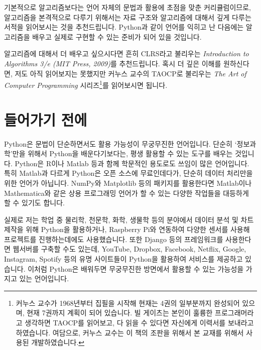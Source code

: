 \documentclass[a4paper,10pt]{memoir}
\begin{document}
기본적으로 알고리즘보다는 언어 자체의 문법과 활용에 초점을 맞춘 커리큘럼이므로, 알고리즘을 본격적으로 다루기 위해서는 자료 구조와 알고리즘에 대해서 깊게 다루는 서적을 읽어보시는 것을 추천드립니다.
Python과 같이 언어를 익히고 난 다음에는 알고리즘을 배우고 실제로 구현할 수 있는 준비가 되어 있을 것입니다.

알고리즘에 대해서 더 배우고 싶으시다면 흔히 CLRS라고 불리우는 \textit{Introduction to Algorithms 3/e (MIT Press, 2009)}를 추천드립니다.
혹시 더 깊은 이해를 원하신다면, 저도 아직 읽어보지는 못했지만 커누스 교수의 TAOCP로 불리우는 \textit{The Art of Computer Programming} 시리즈\footnote{커누스 교수가 1968년부터 집필을 시작해 현재는 4권의 일부분까지 완성되어 있으며, 현재 7권까지 계획이 되어 있습니다. 빌 게이츠는 본인이 훌륭한 프로그래머라고 생각하면 TAOCP를 읽어보고, 다 읽을 수 있다면 자신에게 이력서를 보내라고 하였습니다. 여담으로, 커누스 교수는 이 책의 조판을 위해서 본 교재를 위해서 사용된  개발하였습니다.}를 읽어보시면 됩니다.

\section{들어가기 전에}
Python은 문법이 단순하면서도 활용 가능성이 무궁무진한 언어입니다.
단순히 `정보과학'만을 위해서 Python을 배운다기보다는, 평생 활용할 수 있는 도구를 배우는 것입니다.
Python은 R이나 Matlab 등과 함께 학문적인 용도로도 쓰임이 많은 언어입니다.
특히 Matlab과 다르게 Python은 오픈 소스에 무료인데다가, 단순히 데이터 처리만을 위한 언어가 아닙니다.
NumPy와 Matplotlib 등의 패키지를 활용한다면 Matlab이나 Mathematica와 같은 상용 프로그래밍 언어가 할 수 있는 다양한 작업들을 대등하게 할 수 있기도 합니다.

실제로 저는 학업 중 물리학, 천문학, 화학, 생물학 등의 분야에서 데이터 분석 및 차트 제작을 위해 Python을 활용하거나, Raspberry Pi와 연동하여 다양한 센서를 사용해 프로젝트를 진행하는데에도 사용했습니다.
또한 Django 등의 프레임워크를 사용한다면 웹서버를 구축할 수도 있는데, YouTube, Dropbox, Facebook, Netflix, Google, Instagram, Spotify 등의 유명 사이트들이 Python을 활용하여 서비스를 제공하고 있습니다.
이처럼 Python은 배워두면 무궁무진한 방면에서 활용할 수 있는 가능성을 가지고 있는 언어입니다.
\end{document}
